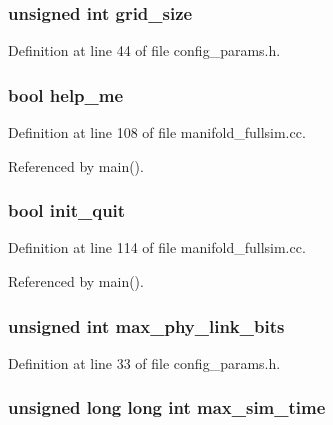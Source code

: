 \subsubsection[{grid\_\-size}]{\setlength{\rightskip}{0pt plus 5cm}unsigned int {\bf grid\_\-size}}\label{sim_8h_850e232aff3d3acf04c7d39346f0bf4c}




Definition at line 44 of file config\_\-params.h.
\subsubsection[{help\_\-me}]{\setlength{\rightskip}{0pt plus 5cm}bool {\bf help\_\-me}}\label{sim_8h_98b74f22826e26c7727ce84f6d3a621b}




Definition at line 108 of file manifold\_\-fullsim.cc.

Referenced by main().
\subsubsection[{init\_\-quit}]{\setlength{\rightskip}{0pt plus 5cm}bool {\bf init\_\-quit}}\label{sim_8h_1d93ba7fce2ae0edcb3665632a12bd49}




Definition at line 114 of file manifold\_\-fullsim.cc.

Referenced by main().
\subsubsection[{max\_\-phy\_\-link\_\-bits}]{\setlength{\rightskip}{0pt plus 5cm}unsigned int {\bf max\_\-phy\_\-link\_\-bits}}\label{sim_8h_81294da08255fbf06c1a30ee6d52059f}




Definition at line 33 of file config\_\-params.h.
\subsubsection[{max\_\-sim\_\-time}]{\setlength{\rightskip}{0pt plus 5cm}unsigned long long int {\bf max\_\-sim\_\-time}}\label{sim_8h_35eb3b8621b39fb3b39217f5fb55bb31}




